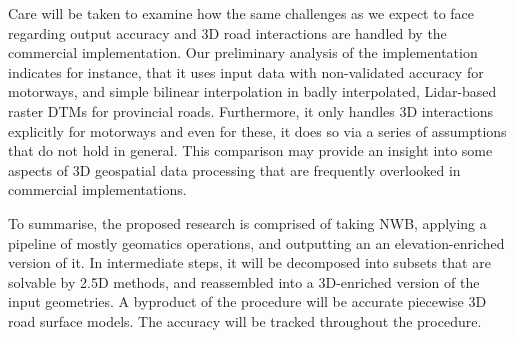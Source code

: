 Care will be taken to examine how the same challenges as we expect to face regarding output accuracy and 3D road interactions are handled by the commercial implementation. Our preliminary analysis of the implementation indicates for instance, that it uses input data with non-validated accuracy for motorways, and simple bilinear interpolation in badly interpolated, Lidar-based raster DTMs for provincial roads. Furthermore, it only handles 3D interactions explicitly for motorways and even for these, it does so via a series of assumptions that do not hold in general. This comparison may provide an insight into some aspects of 3D geospatial data processing that are frequently overlooked in commercial implementations.

To summarise, the proposed research is comprised of taking NWB, applying a pipeline of mostly geomatics operations, and outputting an an elevation-enriched version of it. In intermediate steps, it will be decomposed into subsets that are solvable by 2.5D methods, and reassembled into a 3D-enriched version of the input geometries. A byproduct of the procedure will be accurate piecewise 3D road surface models. The accuracy will be tracked throughout the procedure.